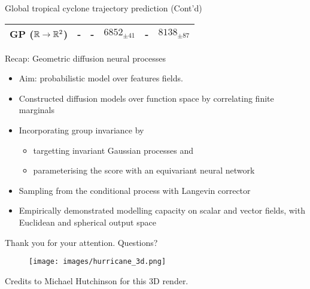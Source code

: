\begin{frame}{Global tropical cyclone trajectory prediction (Cont'd)}
\begin{table}
\begin{tabular}{lrrrrr}
            \textsc{GP ($\mathbb{R}\to\mathbb{R}^2$)} & - & - & $6852_{\pm 41}$ & - & $8138_{\pm 87}$ \\
            \bottomrule
        \end{tabular}
        \label{tab:cyclone_results}
    \end{table}
\end{frame}


\begin{frame}{Recap: Geometric diffusion neural processes}

   \begin{itemize}
      \item Aim: probabilistic model over features fields.
       \item Constructed diffusion models over function space by correlating finite marginals
       \item Incorporating group invariance by 
       \begin{itemize}
       \item targetting invariant Gaussian processes and 
       \item parameterising the score with an equivariant neural network
        \end{itemize}
       \item Sampling from the conditional process with Langevin corrector
       \item Empirically demonstrated modelling capacity on scalar and vector fields, with Euclidean and spherical output space
   \end{itemize}
   
   \end{frame}

\begin{frame}{Thank you for your attention. Questions?}
\begin{figure}
\centering
\texttt{[image: images/hurricane\_3d.png]}
\end{figure}
\vfill
\vspace{-.5cm}
{\footnotesize Credits to Michael Hutchinson for this 3D render.}
\end{frame}